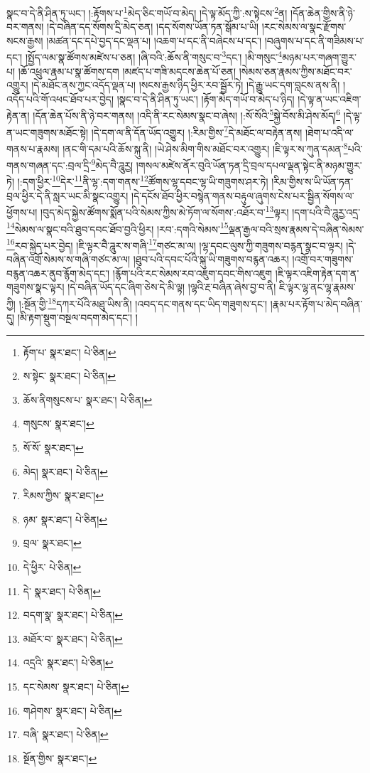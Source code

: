 སྣང་བ་དེ་ནི་ཤིན་ཏུ་ཡང་། །:རྟོགས་པ་\footnote{རྟོག་པ་  སྣར་ཐང་།  པེ་ཅིན། }མེད་ཅིང་གཡོ་བ་མེད། །དེ་ལྟ་མོད་ཀྱི་:ས་སྟེངས་\footnote{ས་སྟེང་  སྣར་ཐང་།  པེ་ཅིན། }ན། །དོན་ཆེན་གྱིས་ནི་ཉེ་བར་གནས། །དེ་བཞིན་དད་སོགས་དྲི་མེད་ཅན། །དད་སོགས་ཡོན་ཏན་སྒོམ་པ་ཡི། །རང་སེམས་ལ་སྣང་རྫོགས་སངས་རྒྱས། །མཚན་དང་དཔེ་བྱད་དང་ལྡན་པ། །འཆག་པ་དང་ནི་བཞེངས་པ་དང་། །བཞུགས་པ་དང་ནི་གཟིམས་པ་དང་། །སྤྱོད་ལམ་སྣ་ཚོགས་མཛེས་པ་ཅན། །ཞི་བའི་:ཆོས་ནི་གསུང་བ་\footnote{ཆོས་ནིགསུངས་པ་  སྣར་ཐང་།  པེ་ཅིན། }དང་། །མི་གསུང་\footnote{གསུངས་  སྣར་ཐང་། }མཉམ་པར་གཞག་གྱུར་པ། །ཆོ་འཕྲུལ་རྣམ་པ་སྣ་ཚོགས་དག །མཛད་པ་གཟི་མདངས་ཆེན་པོ་ཅན། །སེམས་ཅན་རྣམས་ཀྱིས་མཐོང་བར་འགྱུར། །དེ་མཐོང་ནས་ཀྱང་འདོད་ལྡན་པ། །སངས་རྒྱས་ཉིད་ཕྱིར་རབ་སྦྱོར་ཏེ། །དེ་རྒྱུ་ཡང་དག་བླངས་ནས་ནི། །འདོད་པའི་གོ་འཕང་ཐོབ་པར་བྱེད། །སྣང་བ་དེ་ནི་ཤིན་ཏུ་ཡང་། །རྟོག་མེད་གཡོ་བ་མེད་པ་ཉིད། །དེ་ལྟ་ན་ཡང་འཇིག་རྟེན་ན། །དོན་ཆེན་པོས་ནི་ཉེ་བར་གནས། །འདི་ནི་རང་སེམས་སྣང་བ་ཞེས། །:སོ་སོའི་\footnote{སོ་སོ་  སྣར་ཐང་། }སྐྱེ་བོས་མི་ཤེས་མོད།\footnote{མེད།  སྣར་ཐང་།  པེ་ཅིན། } །དེ་ལྟ་ན་ཡང་གཟུགས་མཐོང་སྟེ། །དེ་དག་ལ་ནི་དོན་ཡོད་འགྱུར། །:རིམ་གྱིས་\footnote{རིམས་ཀྱིས་  སྣར་ཐང་། }དེ་མཐོང་ལ་བརྟེན་ནས། །ཐེག་པ་འདི་ལ་གནས་པ་རྣམས། །ནང་གི་དམ་པའི་ཆོས་སྐུ་ནི། །ཡེ་ཤེས་མིག་གིས་མཐོང་བར་འགྱུར། །ཇི་ལྟར་ས་ཀུན་དམན་\footnote{ཉམ་  སྣར་ཐང་།  པེ་ཅིན། }པའི་གནས་གཞན་དང་:བྲལ་དྲི་\footnote{བྲལ་  སྣར་ཐང་། }མེད་བཻ་ཌཱུརྱ། །གསལ་མཛེས་ནོར་བུའི་ཡོན་ཏན་དྲི་བྲལ་དཔལ་ལྡན་སྟེང་ནི་མཉམ་གྱུར་ཏེ། །:དག་ཕྱིར་\footnote{དེ་ཕྱིར་  པེ་ཅིན། }དེར་\footnote{དེ་  སྣར་ཐང་།  པེ་ཅིན། }ནི་ལྷ་:དག་གནས་\footnote{བདག་སྣ་  སྣར་ཐང་།  པེ་ཅིན། }ཚོགས་ལྷ་དབང་ལྷ་ཡི་གཟུགས་ཤར་ཏེ། །རིམ་གྱིས་ས་ཡི་ཡོན་ཏན་བྲལ་ཕྱིར་དེ་ནི་སླར་ཡང་མི་སྣང་འགྱུར། །དེ་དངོས་ཐོབ་ཕྱིར་བསྙེན་གནས་བརྟུལ་ཞུགས་ངེས་པར་སྦྱིན་སོགས་ལ་ཕྱོགས་པ། །བུད་མེད་སྐྱེས་ཚོགས་སྨོན་པའི་སེམས་ཀྱིས་མེ་ཏོག་ལ་སོགས་:འཐོར་བ་\footnote{མཐོར་བ་  སྣར་ཐང་།  པེ་ཅིན། }ལྟར། །དག་པའི་བཻ་ཌཱུརྱ་འདྲ་\footnote{འདྲའི་  སྣར་ཐང་།  པེ་ཅིན། }སེམས་ལ་སྣང་བའི་ཐུབ་དབང་ཐོབ་བྱའི་ཕྱིར། །རབ་:དགའི་སེམས་\footnote{དང་སེམས་  སྣར་ཐང་།  པེ་ཅིན། }ལྡན་རྒྱལ་བའི་སྲས་རྣམས་དེ་བཞིན་སེམས་\footnote{གཤེགས་  སྣར་ཐང་།  པེ་ཅིན། }རབ་སྐྱེད་པར་བྱེད། །ཇི་ལྟར་བཻ་ཌཱུར་ས་གཞི་\footnote{བཞི་  སྣར་ཐང་།  པེ་ཅིན། }གཙང་མ་ལ། །ལྷ་དབང་ལུས་ཀྱི་གཟུགས་བརྙན་སྣང་བ་ལྟར། །དེ་བཞིན་འགྲོ་སེམས་ས་གཞི་གཙང་མ་ལ། །ཐུབ་པའི་དབང་པོའི་སྐུ་ཡི་གཟུགས་བརྙན་འཆར། །འགྲོ་བར་གཟུགས་བརྙན་འཆར་ནུབ་རྙོག་མེད་དང་། །རྙོག་པའི་རང་སེམས་རབ་འཇུག་དབང་གིས་འཇུག །ཇི་ལྟར་འཇིག་རྟེན་དག་ན་གཟུགས་སྣང་ལྟར། །དེ་བཞིན་ཡོད་དང་ཞིག་ཅེས་དེ་མི་ལྟ། །ལྷའི་རྔ་བཞིན་ཞེས་བྱ་བ་ནི། ཇི་ལྟར་ལྷ་ནང་ལྷ་རྣམས་ཀྱི། །:སྔོན་གྱི་\footnote{སྔོན་གྱིས་  སྣར་ཐང་། }དཀར་པོའི་མཐུ་ཡིས་ནི། །འབད་དང་གནས་དང་ཡིད་གཟུགས་དང་། །རྣམ་པར་རྟོག་པ་མེད་བཞིན་དུ། །མི་རྟག་སྡུག་བསྔལ་བདག་མེད་དང་། །
